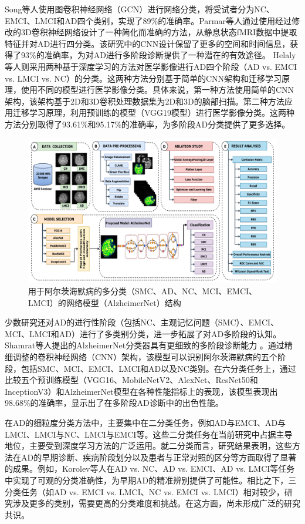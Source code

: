 Song等人\cite{song2019graph}使用图卷积神经网络（GCN）进行网络分类，将受试者分为NC、EMCI、LMCI和AD四个类别，实现了89\%的准确率。Parmar等人\cite{parmar2020spatiotemporal}通过使用经过修改的3D卷积神经网络设计了一种简化而准确的方法，从静息状态fMRI数据中提取特征并对AD进行四分类。该研究中的CNN设计保留了更多的空间和时间信息，获得了93\%的准确率，为对AD进行多阶段诊断提供了一种潜在的有效途径。
Helaly等人\cite{helaly2021deep}则采用两种基于深度学习的方法对医学影像进行AD四个阶段（AD vs. EMCI vs. LMCI vs. NC）的分类。这两种方法分别基于简单的CNN架构和迁移学习原理，使用不同的模型进行医学影像分类。具体来说，第一种方法使用简单的CNN架构，该架构基于2D和3D卷积处理数据集为2D和3D的脑部扫描。第二种方法应用迁移学习原理，利用预训练的模型（VGG19模型）进行医学影像分类。这两种方法分别取得了93.61\%和95.17\%的准确率，为多阶段AD分类提供了更多选择。
   \begin{figure}[htbp]
      \centering
      \includegraphics[width=0.95\linewidth]{figs/5classify.png}
      \caption{用于阿尔茨海默病的多分类（SMC、AD、NC、MCI、EMCI、LMCI）的网络模型（AlzheimerNet）结构}\label{fine5classify}
    \end{figure}
 \fi
 
少数研究还对AD的进行性阶段（包括NC、主观记忆问题（SMC）、EMCI、MCI、LMCI和AD）进行了多类别分类\cite{shamrat2023alzheimernet,ramzan2020deep}，进一步拓展了对AD多阶段的认知。Shamrat等人\cite{shamrat2023alzheimernet}提出的AlzheimerNet分类器具有更细致的多阶段诊断能力
。通过精细调整的卷积神经网络（CNN）架构，该模型可以识别阿尔茨海默病的五个阶段，包括SMC、MCI、EMCI、LMCI和AD以及NC类别。在六分类任务上，通过比较五个预训练模型（VGG16、MobileNetV2、AlexNet、ResNet50和InceptionV3）和AlzheimerNet模型在各种性能指标上的表现，该模型表现出98.68\%的准确率，显示出了在多阶段AD诊断中的出色性能。

在AD的细粒度分类方法中，主要集中在二分类任务，例如AD与EMCI、AD与LMCI、LMCI与NC、LMCI与EMCI等。这些二分类任务在当前研究中占据主导地位，主要受到深度学习方法的广泛运用。就二分类而言，研究结果表明，这些方法在AD的早期诊断、疾病阶段划分以及患者与正常对照的区分等方面取得了显著的成果。例如，Korolev等人\cite{korolev2017residual}在AD vs. NC、AD vs. EMCI、AD vs. LMCI等任务中实现了可观的分类准确性，为早期AD的精准辨别提供了可能性。相比之下，三分类任务（如AD vs. EMCI vs. LMCI、NC vs. EMCI vs. LMCI）相对较少，研究涉及更多的类别，需要更高的分类难度和挑战。在这方面，尚未形成广泛的研究共识。

